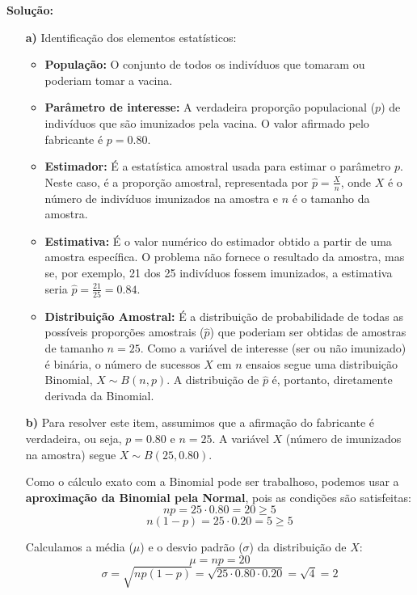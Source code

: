 \documentclass[12pt, a4paper]{article}
\begin{document}
\textbf{Solução:}
\begin{itemize}
    \item[\textbf{a)}] Identificação dos elementos estatísticos:
    \begin{itemize}
        \item \textbf{População:} O conjunto de todos os indivíduos que tomaram ou poderiam tomar a vacina.
        
        \item \textbf{Parâmetro de interesse:} A verdadeira proporção populacional ($p$) de indivíduos que são imunizados pela vacina. O valor afirmado pelo fabricante é $p = 0.80$.
        
        \item \textbf{Estimador:} É a estatística amostral usada para estimar o parâmetro $p$. Neste caso, é a proporção amostral, representada por $\hat{p} = \frac{X}{n}$, onde $X$ é o número de indivíduos imunizados na amostra e $n$ é o tamanho da amostra.
        
        \item \textbf{Estimativa:} É o valor numérico do estimador obtido a partir de uma amostra específica. O problema não fornece o resultado da amostra, mas se, por exemplo, 21 dos 25 indivíduos fossem imunizados, a estimativa seria $\hat{p} = \frac{21}{25} = 0.84$.
        
        \item \textbf{Distribuição Amostral:} É a distribuição de probabilidade de todas as possíveis proporções amostrais ($\hat{p}$) que poderiam ser obtidas de amostras de tamanho $n=25$. Como a variável de interesse (ser ou não imunizado) é binária, o número de sucessos $X$ em $n$ ensaios segue uma distribuição Binomial, $X \sim B(n, p)$. A distribuição de $\hat{p}$ é, portanto, diretamente derivada da Binomial.
    \end{itemize}

    \item[\textbf{b)}] Para resolver este item, assumimos que a afirmação do fabricante é verdadeira, ou seja, $p=0.80$ e $n=25$. A variável $X$ (número de imunizados na amostra) segue $X \sim B(25, 0.80)$.
    
    Como o cálculo exato com a Binomial pode ser trabalhoso, podemos usar a \textbf{aproximação da Binomial pela Normal}, pois as condições são satisfeitas:
    $$ np = 25 \cdot 0.80 = 20 \ge 5 $$
    $$ n(1-p) = 25 \cdot 0.20 = 5 \ge 5 $$
    
    Calculamos a média ($\mu$) e o desvio padrão ($\sigma$) da distribuição de $X$:
    $$ \mu = np = 20 $$
    $$ \sigma = \sqrt{np(1-p)} = \sqrt{25 \cdot 0.80 \cdot 0.20} = \sqrt{4} = 2 $$
    

\end{itemize}
\end{document}

